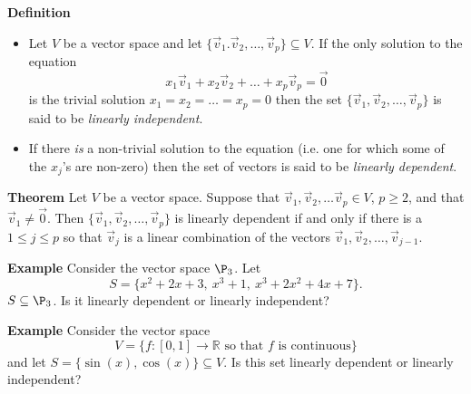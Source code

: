  \begin{frame}[fragile]
\textbf{Definition}
\begin{itemize}
\item   Let $V$ be a vector space and let
$\{\vec{v}_1. \vec{v}_2, \dots , \vec{v}_p\} \subseteq V$.
If the only solution to the equation 
$$x_1 \vec{v}_1 + x_2 \vec{v}_2 + \dots +  x_p\vec{v}_p = \vec{0}$$ 
is the trivial solution $x_1 = x_2 = \dots =x_p=0$ then the set 
$\{ \vec{v}_1, \vec{v}_2, \dots ,\vec{v}_p\}$ is said to be {\em linearly 
independent}.
\item If there {\em is} a non-trivial solution to the equation (i.e. one for which some of the 
$x_j$'s are non-zero) then the set of vectors is said to be {\em linearly dependent}.
\end{itemize}



\textbf{Theorem}  Let $V$ be a vector space.
Suppose that $\vec{v}_1, \vec{v}_2,\dots  \vec{v}_p \in V$, $p\geq 2$, 
and that $\vec{v}_1 \neq \vec{0}$.  Then $\{\vec{v}_1,\vec{v}_2, \dots , \vec{v}_p\}$
is linearly dependent if and only if there is a $1\le j \leq p$ so that $\vec{v}_j$ is a 
linear combination of the vectors $\vec{v}_1, \vec{v}_2, \dots,\vec{v}_{j-1}$.

\end{frame}







 \begin{frame}[fragile]

\textbf{Example}
 Consider the vector space $\P_3$.  Let 
\[ 
S= \{x^2+2x+3,\ x^3+1,\ x^3+2x^2 + 4x +7 \}.
\]
$S \subseteq \P_3$.  Is it linearly dependent or linearly independent?



\textbf{Example}
Consider the vector space 
\[
V = \{f:[0,1] \longrightarrow \mathbb R \mbox{ so that } f \mbox{ is continuous} \}
\]
and let $S = \{ \sin(x), \cos(x) \} \subseteq V$.  Is this set linearly 
dependent or linearly independent?


\end{frame}







